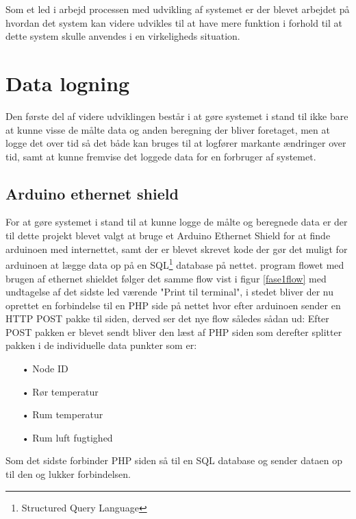 Som et led i arbejd processen med udvikling af systemet er der blevet arbejdet på hvordan det system kan videre udvikles til at have mere funktion i forhold til at dette system skulle anvendes i en virkeligheds situation.

\section{Data logning}
Den første del af videre udviklingen består i at gøre systemet i stand til ikke bare at kunne visse de målte data og anden beregning der bliver foretaget, men at logge det over tid så det både kan bruges til at logfører markante ændringer over tid, samt at kunne fremvise det loggede data for en forbruger af systemet.

\subsection{Arduino ethernet shield}
For at gøre systemet i stand til at kunne logge de målte og beregnede data er der til dette projekt blevet valgt at bruge et Arduino Ethernet Shield for at finde arduinoen med internettet, samt der er blevet skrevet kode der gør det muligt for arduinoen at lægge data op på en SQL\footnote{Structured Query Language} database på nettet.
\newline
program flowet med brugen af ethernet shieldet følger det samme flow vist i figur \ref{fase1flow}
med undtagelse af det sidste led værende "Print til terminal", i stedet bliver der nu oprettet en forbindelse til en PHP side på nettet hvor efter arduinoen sender en HTTP POST pakke til siden, derved ser det nye flow således sådan ud:
\newline
Efter POST pakken er blevet sendt bliver den læst af PHP siden som derefter splitter pakken i de individuelle data punkter som er:
\begin{enumerate}
	\item[•]Node ID
	\item[•]Rør temperatur
	\item[•]Rum temperatur
	\item[•]Rum luft fugtighed
\end{enumerate}
Som det sidste forbinder PHP siden så til en SQL database og sender dataen op til den og lukker forbindelsen.
